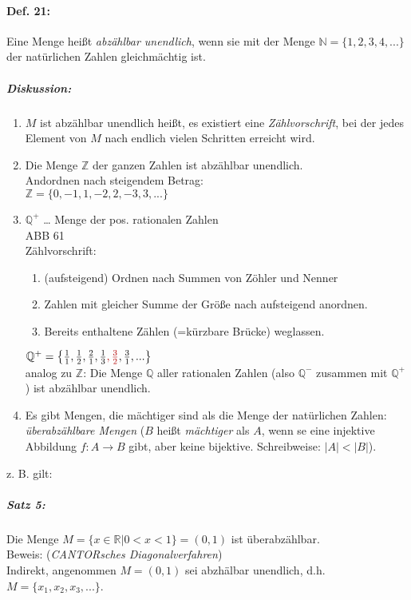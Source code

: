 \paragraph{Def. 21:} \parskp
Eine Menge heißt \emph{abzählbar unendlich}, wenn sie mit der Menge $\mathbb{N}=\{1,2,3,4,...\}$ der natürlichen Zahlen gleichmächtig ist.

\subparagraph{Diskussion:}

\begin{enumerate}
\item $M$ ist abzählbar unendlich heißt, es existiert eine \emph{Zählvorschrift}, bei der jedes Element von $M$ nach endlich vielen Schritten erreicht wird.
\item Die Menge $\mathbb{Z}$ der ganzen Zahlen ist abzählbar unendlich. \\
Andordnen nach steigendem Betrag:\\
$\mathbb{Z}=\{0,-1,1,-2,2,-3,3, ...\}$
\item $\mathbb{Q}^+$ … Menge der pos. rationalen Zahlen\\
ABB 61\\
Zählvorschrift:
\begin{enumerate}
\item (aufsteigend) Ordnen nach Summen von Zöhler und Nenner
\item Zahlen mit gleicher Summe der Größe nach aufsteigend anordnen.
\item Bereits enthaltene Zählen (=kürzbare Brücke) weglassen.
\end{enumerate}
$\mathbb{Q}^+=\left\lbrace\frac{1}{1},\frac{1}{2}, \frac{2}{1}, \frac{1}{3}\textcolor{red}{, \frac{3}{2}}, \frac{3}{1}, ... \right\rbrace$\\
analog zu $\mathbb{Z}$: Die Menge $\mathbb{Q}$ aller rationalen Zahlen (also $\mathbb{Q}^-$ zusammen mit $\mathbb{Q}^+$) ist abzählbar unendlich.
\item Es gibt Mengen, die mächtiger sind als die Menge der natürlichen Zahlen: \emph{überabzählbare Mengen} ($B$ heißt \emph{mächtiger} als $A$, wenn se eine injektive Abbildung $f: A \rightarrow B$ gibt, aber keine bijektive. Schreibweise: $|A|<|B|$).\\
\end{enumerate}
z. B. gilt:
\subparagraph{Satz 5:} Die Menge $M=\{x \in \mathbb{R} | 0<x<1\}=(0,1)$ ist überabzählbar.\\
Beweis: (\emph{CANTORsches Diagonalverfahren})\\
Indirekt, angenommen $M=(0,1)$ sei abzhälbar unendlich, d.h. $M=\{x_1, x_2, x_3, ...\}$.\\
